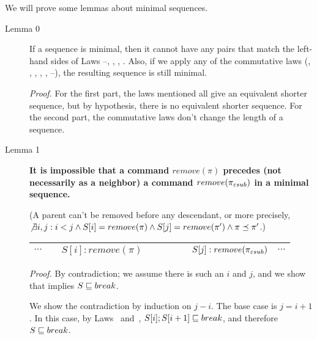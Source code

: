 We will prove some lemmas about minimal sequences.
\begin{description}
\item[Lemma 0]
If a sequence is minimal, then it cannot have any pairs that match the
left-hand sides of Laws \lawx--\lawxxxv, \lawiia, \lawiiap, \lawiiib.
Also, if we apply any of the
commutative laws 
(\lawi, \lawip, \lawiib, \lawiiia, \lawiiiap, \lawiv--\lawix),
the resulting sequence is still minimal.

\emph{Proof.}
For the first part, the laws mentioned all give an equivalent shorter
sequence, but by hypothesis, there is no equivalent shorter sequence.
For the second part, the commutative laws don't change the length of a
sequence.

\item[Lemma 1] {\bf It is impossible that a command
\(remove(\pi)\) precedes (not necessarily as a neighbor) a command
\(remove(\pi_{\varepsilon sub})\) in a minimal sequence.} 
\begin{notrsi}
(A parent can't be removed before any descendant, or
more precisely, \(\not\exists i,j: i<j \land S[i] = remove(\pi) \land
S[j] = remove(\pi') \land \pi \preceq \pi'\).)
\end{notrsi}
\begin{notrsi}
\begin{center}
\begin{tabular}{c|c|c|c|c|c|c|c|c}
\hline
\(\cdots\) & & \(S[i]: remove(\pi)\) & & & & &
\(S[j]: remove(\pi_{\varepsilon sub})\) & \(\cdots\) \\
\hline
\end{tabular}
\end{center}
\end{notrsi}
\emph{Proof.}
By contradiction; we assume there is such an \(i\) and \(j\), and we show
that implies \(S \sqsubseteq break\).

We show the contradiction by induction on \(j-i\).
The base case is \(j = i+1\).
In this case, by Laws \lawxxii~and~\lawxxiii, 
\(S[i]; S[i+1] \sqsubseteq break\),
and therefore \(S\sqsubseteq break\).


\end{description}
